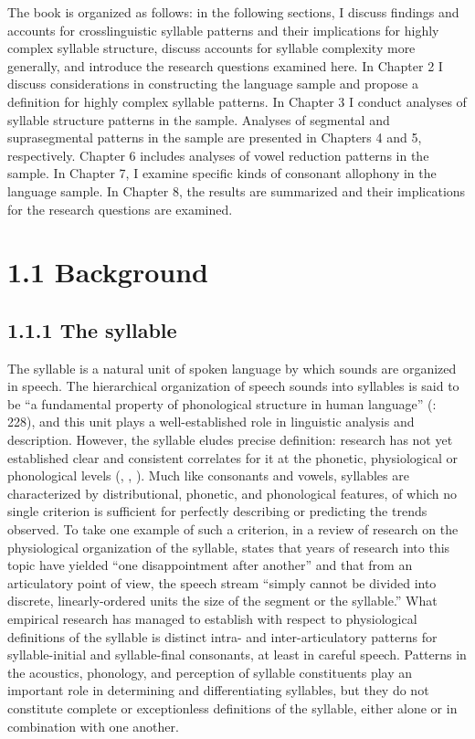   The book is organized as follows: in the following sections, I discuss findings and accounts for crosslinguistic syllable patterns and their implications for highly complex syllable structure, discuss accounts for syllable complexity more generally, and introduce the research questions examined here. In Chapter 2 I discuss considerations in constructing the language sample and propose a definition for highly complex syllable patterns. In Chapter 3 I conduct analyses of syllable structure patterns in the sample. Analyses of segmental and suprasegmental patterns in the sample are presented in Chapters 4 and 5, respectively. Chapter 6 includes analyses of vowel reduction patterns in the sample. In Chapter 7, I examine specific kinds of consonant allophony in the language sample. In Chapter 8, the results are summarized and their implications for the research questions are examined.

\section{1.1 Background}
\subsection{1.1.1 The syllable}

  The syllable is a natural unit of spoken language by which sounds are organized in speech. The hierarchical organization of speech sounds into syllables is said to be “a fundamental property of phonological structure in human language” (\citealt{GoldsteinEtAl2006}: 228), and this unit plays a well-established role in linguistic analysis and description. However, the syllable eludes precise definition: research has not yet established clear and consistent correlates for it at the phonetic, physiological or phonological levels (\citealt{BellHooper1978}, \citealt{Laver1994}, \citealt{Krakow1999}). Much like consonants and vowels, syllables are characterized by distributional, phonetic, and phonological features, of which no single criterion is sufficient for perfectly describing or predicting the trends observed. To take one example of such a criterion, in a review of research on the physiological organization of the syllable, \citet[23-34]{Krakow1999} states that years of research into this topic have yielded “one disappointment after another” and that from an articulatory point of view, the speech stream “simply cannot be divided into discrete, linearly-ordered units the size of the segment or the syllable.” What empirical research has managed to establish with respect to physiological definitions of the syllable is distinct intra- and inter-articulatory patterns for syllable-initial and syllable-final consonants, at least in careful speech. Patterns in the acoustics, phonology, and perception of syllable constituents play an important role in determining and differentiating syllables, but they do not constitute complete or exceptionless definitions of the syllable, either alone or in combination with one another.


